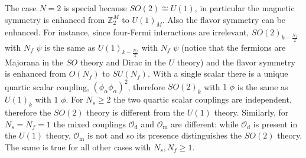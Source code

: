 \documentclass[a4paper, 12pt]{article}
\numberwithin{equation}{section}
\newcommand{\cO}{\mathcal{O}}
\newcommand{\bZ}{\mathbb{Z}}
\begin{document}
The case $N=2$ is special because $SO(2) \cong U(1)$, in particular the magnetic symmetry is enhanced from $\bZ_2^M$ to $U(1)_M$. Also the flavor symmetry can be enhanced. For instance, since four-Fermi interactions are irrelevant, $SO(2)_{k-\frac{N_f}2}$ with $N_f$ $\psi$ is the same as $U(1)_{k - \frac{N_f}2}$ with $N_f$ $\psi$ (notice that the fermions are Majorana in the $SO$ theory and Dirac in the $U$ theory) and the flavor symmetry is enhanced from $O(N_f)$ to $SU(N_f)$. With a single scalar there is a unique quartic scalar coupling, $(\phi_\alpha \phi_\alpha)^2$, therefore $SO(2)_k$ with $1$ $\phi$ is the same as $U(1)_k$ with $1$ $\phi$. For $N_s\geq 2$ the two quartic scalar couplings are independent, therefore the $SO(2)$ theory is different from the $U(1)$ theory. Similarly, for $N_s = N_f=1$ the mixed couplings $\cO_\text{d}$ and $\cO_\text{m}$ are different: while $\cO_\text{d}$ is present in the $U(1)$ theory, $\cO_\text{m}$ is not and so its presence distinguishes the $SO(2)$ theory. The same is true for all other cases with $N_s, N_f \geq 1$.
\end{document}

